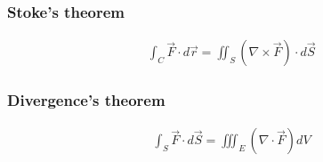 \documentclass{article}
\begin{document}
        \subsubsection{Stoke's theorem}
            \begin{align*}
                \int_C\vec{F}\cdot d\vec{r} = \iint_S(\nabla\times\vec{F})\cdot d\vec{S}
            \end{align*}
        \subsubsection{Divergence's theorem}
            \begin{align*}
                \int_S\vec{F}\cdot d\vec{S} = \iiint_E(\nabla\cdot\vec{F}) dV
            \end{align*}
            
\cite{PaulsNotes}



\end{document}
